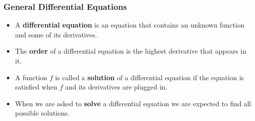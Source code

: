 \begin{frame}
\frametitle{General Differential Equations}
\begin{definition} 
\begin{itemize}
\item<1->
A \textbf{differential equation} is an equation that contains an unknown function and some of its derivatives.


\item<2->
The \textbf{order} of a differential equation is the highest derivative that appears in it.


\item<3->
A function $f$ is called a \textbf{solution} of a differential equation if the equation is satisfied when $f$ and its derivatives are plugged in.


\item<4->
When we are asked to \textbf{solve} a differential equation we are expected to find all possible solutions.
\end{itemize}
\end{definition}
\end{frame}
